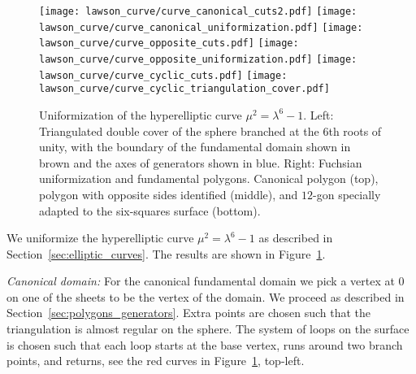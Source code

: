 \documentclass[Thesis]{subfiles}
\begin{document}

\begin{figure}
	\centering
	\resizebox{!}{6.3cm} {
	\texttt{[image: lawson\_curve/curve\_canonical\_cuts2.pdf]}
	\texttt{[image: lawson\_curve/curve\_canonical\_uniformization.pdf]}
	}
	\resizebox{!}{6.3cm} {
	\texttt{[image: lawson\_curve/curve\_opposite\_cuts.pdf]}
	\texttt{[image: lawson\_curve/curve\_opposite\_uniformization.pdf]}
	}
	\resizebox{!}{6.3cm} {
	\texttt{[image: lawson\_curve/curve\_cyclic\_cuts.pdf]}
	\texttt{[image: lawson\_curve/curve\_cyclic\_triangulation\_cover.pdf]}
	}
	\caption{Uniformization of the hyperelliptic curve
          $\mu^2=\lambda^6-1$. Left: Triangulated double cover of the
          sphere branched at the 6th roots of unity, with the boundary
          of the fundamental domain shown in brown and the axes of
          generators shown in blue. Right: Fuchsian uniformization and
          fundamental polygons. Canonical polygon (top), polygon with
          opposite sides identified (middle), and $12$-gon specially
          adapted to the six-squares surface (bottom).}
	\label{fig:lawson_curve}
\end{figure}

We uniformize the hyperelliptic curve $\mu^2=\lambda^6-1$ as described
in Section~\ref{sec:elliptic_curves}. The results are shown in Figure~\ref{fig:lawson_curve}.


 \textit{Canonical domain:}
 For the canonical fundamental domain we pick a vertex at $0$ on one of the sheets to be the vertex of the domain.
 We proceed as described in Section~\ref{sec:polygons_generators}.
Extra points are chosen such that the triangulation is almost regular on the sphere.
 The system of loops on the surface is chosen such that each loop starts at the base vertex, runs around two branch points, and returns, see the red curves in Figure~\ref{fig:lawson_curve}, top-left.
\end{document}
